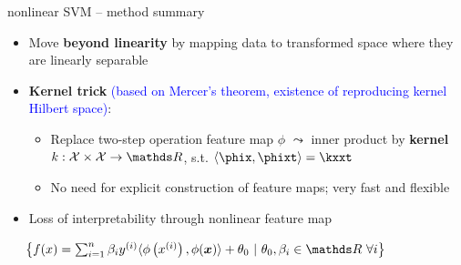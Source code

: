 \begin{frame}{nonlinear SVM -- method summary}

\footnotesize

   

\medskip

\begin{itemize}
  \item Move \textbf{beyond linearity} by mapping data to 
  transformed space where they are linearly separable
  \item \textbf{Kernel trick} \textcolor{blue}{(based on Mercer's theorem, 
  existence of reproducing kernel Hilbert space)}: 
  \begin{itemize}
    \item Replace two-step operation feature map $\phi$ $\leadsto$ inner product 
    by \textbf{kernel} $k: \Xspace \times \Xspace \rightarrow \R$, s.t.
    $\scp{\phix}{\phixt} = \kxxt$
    \item No need for explicit construction of feature maps; very fast and 
    flexible
  \end{itemize}
  \item Loss of interpretability through nonlinear feature map
\end{itemize}

\medskip


 ~~
$\left \{ \fx = \sumin \beta_i \yi \langle \phi \left( \xi \right), 
    \phi(\xv) \rangle  + 
    \theta_0 ~|~ \theta_0, \beta_i \in \R ~ \forall i \right \}$


\end{frame}
